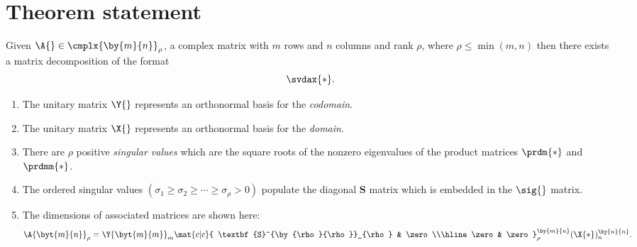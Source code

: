 \section{Theorem statement}

Given $\A{}\in\cmplx{\by{m}{n}}_{\rho}$, a complex matrix with $m$ rows and $n$ columns and rank $\rho$, where $\rho \le \min( m, n )$ then there exists a matrix decomposition of the format
\begin{equation}
  \svdax{*} .
\end{equation}
\begin{enumerate}
  \item The unitary matrix $\Y{}$ represents an orthonormal basis for the \textit{codomain}.
  \item The unitary matrix $\X{}$ represents an orthonormal basis for the \textit{domain}.
  \item There are $\rho$ positive \textit{singular values} which are the square roots of the nonzero eigenvalues of the product matrices $\prdm{*}$ and $\prdmm{*}$.
  \item The ordered singular values $\left( \sigma_1 \ge \sigma_2 \ge \cdots \ge \sigma_{\rho} > 0 \right)$ populate the diagonal $\textbf{S}$ matrix which is embedded in the $\sig{}$ matrix.
  \item The dimensions of associated matrices are shown here:
\begin{equation}
  \A{\byt{m}{n}}_{\rho} = 
  \Y{\byt{m}{m}}_{m}
  \mat{c|c}{
  \textbf{S}^{\by{\rho}{\rho}}_{\rho}  &  \zero \\\hline
  \zero  &  \zero
  }^{\by{m}{n}}_{\rho} 
  (\X{*})^{\by{n}{n}}_{n}.
\end{equation}
\end{enumerate}

%
